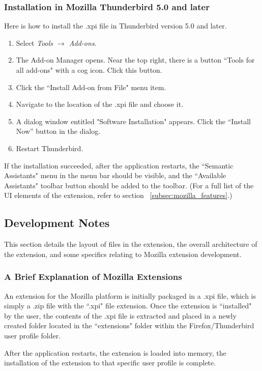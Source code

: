 \subsubsection{Installation in Mozilla Thunderbird 5.0 and later}
Here is how to install the .xpi file in Thunderbird version 5.0 and later. 
\begin{enumerate}
  \item Select \emph{Tools $\rightarrow$ Add-ons}.
  \item The Add-on Manager opens. Near the top right, there is a button ``Tools for all add-ons" with a cog icon. Click this button.
  \item Click the ``Install Add-on from File" menu item.
  \item Navigate to the location of the .xpi file and choose it.
  \item A dialog window entitled "Software Installation" appears. Click the ``Install Now'' button in the dialog.
  \item Restart Thunderbird.
\end{enumerate}

If the installation succeeded, after the application restarts, the ``Semantic Assistants" menu in the menu bar should be visible, and the ``Available Assistants" toolbar button should be added to the toolbar. (For a full list of the UI elements of the extension, refer to section ~\ref{subsec:mozilla_features}.)

\subsection{Development Notes}
\label{subsec:mozilla_development}
This section details the layout of files in the extension, the overall architecture of the extension, and some specifics relating to Mozilla extension development. 

\subsubsection{A Brief Explanation of Mozilla Extensions}
An extension for the Mozilla platform is initially packaged in a .xpi file, which is simply a .zip file with the ``.xpi" file extension. Once the extension is ``installed" by the user, the contents of the .xpi file is extracted and placed in a newly created folder located in the ``extensions" folder within the Firefox/Thunderbird user profile folder. 

After the application restarts, the extension is loaded into memory, the installation of the extension to that specific user profile is complete.  

